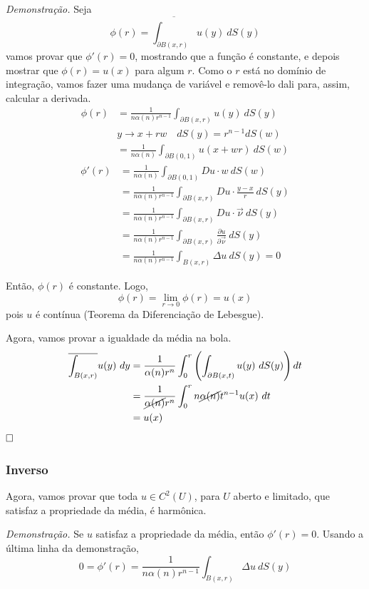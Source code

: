 \documentclass[11pt]{article}
\newcommand{\qed}{$\hfill\square$}
\newcommand{\p}{\partial}
\newcommand{\pde}[2]{\frac{\p #1}{\p #2}}
\newcommand{\dirdev}[1]{\pde{#1}{\vec{\nu}}}
\begin{document}
\textit{Demonstração.} Seja \[\phi(r) =  \overline{\int_{\p B(x,r)}} u(y)\ dS(y) \] vamos provar que \(\phi'(r)=0\), mostrando que a função é constante, e depois mostrar que \( \phi(r)=u(x) \) para algum \(r\). Como o \( r \) está no domínio de integração, vamos fazer uma mudança de variável e removê-lo dali para, assim, calcular a derivada.
\begin{align*}
	\phi(r) &= \frac{1}{n \alpha(n) r^{n-1}} \int_{\p B(x,r)} u(y)\ dS(y) \\
	&y \rightarrow x + rw \quad dS(y) = r^{n-1}dS(w) \\
	&= \frac{1}{n \alpha(n)} \int_{\p B(0,1)} u(x + wr)\ dS(w)
\end{align*}
\begin{align*}
	\phi'(r) &= \frac{1}{n \alpha(n)} \int_{\p B(0,1)} Du \cdot w\ dS(w)\\
	 &= \frac{1}{n \alpha(n) r^{n-1}} \int_{\p B(x,r)} Du \cdot \frac{y-x}{r}\ dS(y)\\
	 &= \frac{1}{n \alpha(n) r^{n-1}} \int_{\p B(x,r)} Du \cdot \vec{\nu}\ dS(y)\\
	 &= \frac{1}{n \alpha(n) r^{n-1}} \int_{\p B(x,r)} \dirdev{u}\ dS(y)\\
	 &= \frac{1}{n \alpha(n) r^{n-1}} \int_{B(x,r)} \Delta u \ dS(y) =0
\end{align*}

Então, \( \phi(r) \) é constante. Logo, \[ \phi(r) = \lim_{r\rightarrow0}\phi(r) = u(x) \] pois \( u \) é contínua (Teorema da Diferenciação de Lebesgue).

Agora, vamos provar a igualdade da média na bola. \begin{align*}
	\overline{\int_{B(x,r)}} u(y)\ dy &= \frac{1}{\alpha(n) r^{n}} \int_0^r \left( \int_{\p B(x,t)} u(y)\ dS(y) \right) dt \\
	&= \frac{1}{\cancel{\alpha(n)} r^{n}} \int_0^r n \cancel{\alpha(n)} t^{n-1} u(x)\ dt \\
	&= u(x) 
\end{align*}
\qed 
\subsubsection*{Inverso}

Agora, vamos provar que toda \( u \in C^2(U) \), para \( U \) aberto e limitado, que satisfaz a propriedade da média, é harmônica. 

\textit{Demonstração.} Se \( u \) satisfaz a propriedade da média, então \( \phi'(r)=0 \). Usando a última linha da demonstração, \[ 0 =\phi'(r)= \frac{1}{n \alpha(n) r^{n-1}} \int_{B(x,r)} \Delta u \ dS(y)\]
\end{document}
